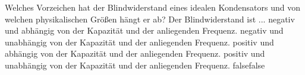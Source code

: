     {Welches Vorzeichen hat der Blindwiderstand eines idealen Kondensators und von welchen physikalischen Größen hängt er ab? Der Blindwiderstand ist ...}
    {negativ und abhängig von der Kapazität und der anliegenden Frequenz.}
    {negativ und unabhängig von der Kapazität und der anliegenden Frequenz.}
    {positiv und abhängig von der Kapazität und der anliegenden Frequenz.}
    {positiv und unabhängig von der Kapazität und der anliegenden Frequenz.}
    {false}{false}